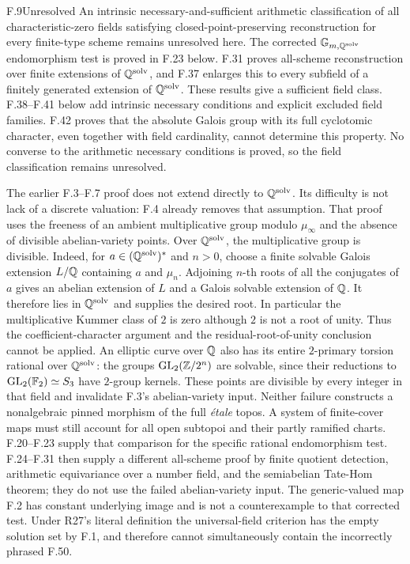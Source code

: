 \begin{claim}{F.9}{Unresolved}
An intrinsic necessary-and-sufficient arithmetic classification of
all characteristic-zero fields satisfying closed-point-preserving
reconstruction for every finite-type scheme remains unresolved here.
The corrected $\mathbb G_{m,\mathbb Q^{\mathrm{solv}}}$ endomorphism
test is proved in F.23 below. F.31 proves all-scheme
reconstruction over finite extensions of $\mathbb Q^{\mathrm{solv}}$,
and F.37 enlarges this to every subfield of a finitely generated
extension of $\mathbb Q^{\mathrm{solv}}$. These results give a
sufficient field class. F.38--F.41 below add intrinsic necessary
conditions and explicit excluded field families. F.42 proves that
the absolute Galois group with its full cyclotomic character,
even together with field cardinality, cannot determine this
property. No converse to the arithmetic necessary conditions
is proved, so the field classification remains unresolved.
\end{claim}
The earlier F.3--F.7 proof does not extend directly to
$\mathbb Q^{\mathrm{solv}}$. Its difficulty is not lack of a discrete
valuation: F.4 already removes that assumption. That proof uses the
freeness of an ambient multiplicative group modulo $\mu_\infty$
and the absence of divisible abelian-variety points. Over
$\mathbb Q^{\mathrm{solv}}$, the multiplicative group is divisible.
Indeed, for $a\in(\mathbb Q^{\mathrm{solv}})^*$ and $n>0$, choose
a finite solvable Galois extension $L/\mathbb Q$ containing $a$ and
$\mu_n$. Adjoining $n$-th roots of all the conjugates of $a$
gives an abelian extension of $L$ and a Galois solvable extension
of $\mathbb Q$. It therefore lies in $\mathbb Q^{\mathrm{solv}}$ and supplies
the desired root. In particular the multiplicative Kummer class
of $2$ is zero although $2$ is not a root of unity.
Thus the coefficient-character argument and
the residual-root-of-unity conclusion cannot be applied. An elliptic
curve over $\mathbb Q$ also has its entire $2$-primary torsion rational
over $\mathbb Q^{\mathrm{solv}}$: the groups
$\operatorname{GL}_2(\mathbb Z/2^n)$ are solvable, since their reductions
to $\operatorname{GL}_2(\mathbb F_2)\simeq S_3$ have $2$-group kernels.
These points are divisible by every integer in that field and
invalidate F.3's abelian-variety input. Neither failure constructs
a nonalgebraic pinned morphism of the full \emph{\'etale} topos.
A system of finite-cover maps must still account for all open
subtopoi and their partly ramified charts. F.20--F.23 supply that
comparison for the specific rational endomorphism test.
F.24--F.31 then supply a different all-scheme proof by finite
quotient detection, arithmetic equivariance over a number field,
and the semiabelian Tate-Hom theorem; they do not use the failed
abelian-variety input. The generic-valued map
F.2 has constant underlying image and is not a counterexample
to that corrected test. Under R27's literal definition the universal-field
criterion has the empty solution set by F.1, and therefore cannot
simultaneously contain the incorrectly phrased F.50.


